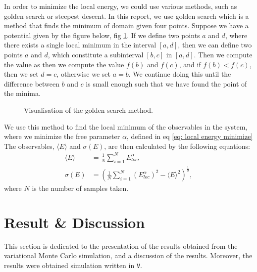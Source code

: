 \documentclass[a4paper]{article}
\newcommand{\newparagraph}{\vspace{.5cm}\noindent}
\newcommand{\average}[1]{\langle #1 \rangle}
\begin{document}
\newparagraph
In order to minimize the local energy, we could use various methods, such as golden search or steepest descent.
In this report, we use golden search which is a method that finds the minimum of domain given four points. Suppose we have a potential given by the figure below, fig \ref{fig: golden search}.
If we define two points $a$ and $d$, where there exists a single local minimum in the interval $[a, d]$, then we can define two points $a$ and $d$, which constitute a subinterval $[b,c]$ in $[a,d]$.
Then we compute the value as then we compute the value $f(b)$ and $f(c)$, and if $f(b) < f(c)$, then we set $d = c$, otherwise we set $a = b$.
We continue doing this until the difference between $b$ and $c$ is small enough such that we have found the point of the minima.
\begin{figure}[H]
    \centering
    \caption{Visualisation of the golden search method.}
    \label{fig: golden search}
\end{figure}\noindent
We use this method to find the local minimum of the observables in the system, where we minimize the free parameter $\alpha$, defined in eq \eqref{eq: local energy minimize}
The observables, $\average{E}$ and $\sigma(E)$, are then calculated by the following equations:
\begin{align}
    \average{E} &= \frac{1}{N}\sum_{i = 1}^N E_{loc}^\alpha, \label{eq: average energy}\\
    \sigma(E) &= \left(\frac{1}{N}\sum_{i = 1}^N \left(E_{loc}^\alpha\right)^2 - \average{E}^2\right)^{\frac{1}{2}},\label{eq: variance energy}
\end{align}where $N$ is the number of samples taken.
\newpage
\section{Result \& Discussion}
This section is dedicated to the presentation of the results obtained from the variational Monte Carlo simulation, and a discussion of the results.
Moreover, the results were obtained simulation written in \verb|V|.
\end{document}
